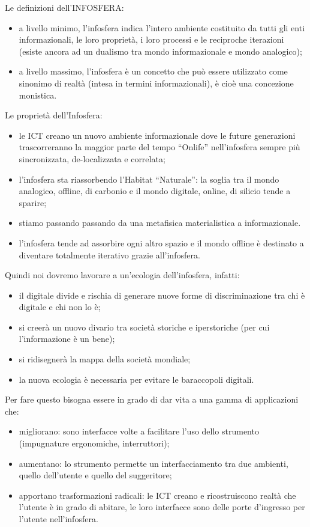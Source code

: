 \documentclass[a4page, 11pt]{article}
\begin{document}
Le definizioni dell'INFOSFERA:
\begin{itemize}
  \item a livello minimo, l'infosfera indica l'intero ambiente costituito da tutti gli enti informazionali, le loro proprietà, i loro processi e le reciproche iterazioni (esiste ancora ad un dualismo tra mondo informazionale e mondo analogico);
  \item a livello massimo, l'infosfera è un concetto che può essere utilizzato come sinonimo di realtà (intesa in termini informazionali), è cioè una concezione monistica.
\end{itemize}
Le proprietà dell'Infosfera:
\begin{itemize}
  \item le ICT creano un nuovo ambiente informazionale dove le future generazioni trascorreranno la maggior parte del tempo ``Onlife'' nell'infosfera sempre più sincronizzata, de-localizzata e correlata;
  \item l'infosfera sta riassorbendo l'Habitat ``Naturale'': la soglia tra il mondo analogico, offline, di carbonio e il mondo digitale, online, di silicio tende a sparire;
  \item stiamo passando passando da una metafisica materialistica a informazionale.
  \item l'infosfera tende ad assorbire ogni altro spazio e il mondo offline è destinato a diventare totalmente iterativo grazie all'infosfera.
\end{itemize}
Quindi noi dovremo lavorare a un'ecologia dell'infosfera, infatti:
\begin{itemize}
  \item il digitale divide e rischia di generare nuove forme di discriminazione tra chi è digitale e chi non lo è;
  \item si creerà un nuovo divario tra società storiche e iperstoriche (per cui l'informazione è un bene);
  \item si ridisegnerà la mappa della società mondiale;
  \item la nuova ecologia è necessaria per evitare le baraccopoli digitali.
\end{itemize}

Per fare questo bisogna essere in grado di dar vita a una gamma di applicazioni che:
\begin{itemize}
  \item migliorano: sono interfacce volte a facilitare l'uso dello strumento (impugnature ergonomiche, interruttori);
  \item aumentano: lo strumento permette un interfacciamento tra due ambienti, quello dell'utente e quello del suggeritore;
  \item apportano trasformazioni radicali: le ICT creano e ricostruiscono realtà che l'utente è in grado di abitare, le loro interfacce sono delle porte d'ingresso per l'utente nell'infosfera.
\end{itemize}
\end{document}

